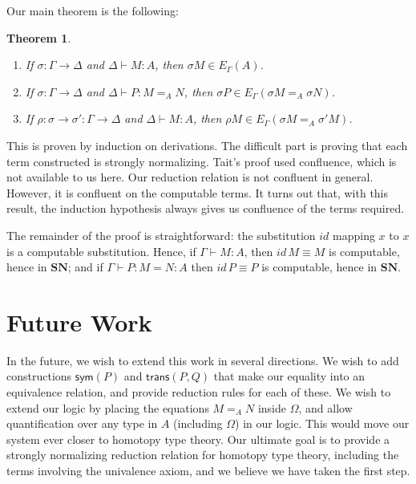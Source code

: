 \documentclass{easychair}
\newcommand{\SN}{\mathbf{SN}}
\newtheorem{theorem}{Theorem}
\begin{document}
Our main theorem is the following:

\begin{theorem}
\begin{enumerate}
\item
If $\sigma : \Gamma \rightarrow \Delta$ and $\Delta \vdash M : A$, then $\sigma M \in E_\Gamma(A)$.
\item
If $\sigma : \Gamma \rightarrow \Delta$ and $\Delta \vdash P : M =_A N$, then $\sigma P \in E_\Gamma(\sigma M =_A \sigma N)$.
\item
If $\rho : \sigma \rightarrow \sigma' : \Gamma \rightarrow \Delta$ and $\Delta \vdash M : A$, then $\rho M \in E_\Gamma(\sigma M =_A \sigma' M)$.
\end{enumerate}
\end{theorem}

This is proven by induction on derivations.  The difficult part is proving that each term constructed is strongly normalizing.  Tait's proof used confluence, which is not available to us here.  Our reduction relation is not confluent in general.  However, it is confluent on the computable terms.  It turns out that, with this result, the induction hypothesis always gives us
confluence of the terms required.

The remainder of the proof is straightforward: the substitution $id$ mapping $x$ to $x$ is a computable substitution.
Hence, if $\Gamma \vdash M : A$, then $id \, M \equiv M$ is computable, hence in $\SN$; and if $\Gamma \vdash P : M = N : A$ then $id \, P \equiv P$ is computable, hence in $\SN$.

\section{Future Work}

In the future, we wish to extend this work in several directions.  We wish to add constructions $\mathsf{sym}(P)$ and $\mathsf{trans}(P,Q)$ that make our equality into an equivalence
relation, and provide reduction rules for each of these.  We wish to extend our logic by placing the equations $M =_A N$ inside $\Omega$, and allow quantification over any type in $A$ (including $\Omega$) in our logic.  This would move our system ever closer to homotopy type theory.  Our ultimate goal is to provide a strongly normalizing reduction relation for homotopy type theory, including the terms involving the univalence axiom, and we believe we have taken the first step.
\end{document}
